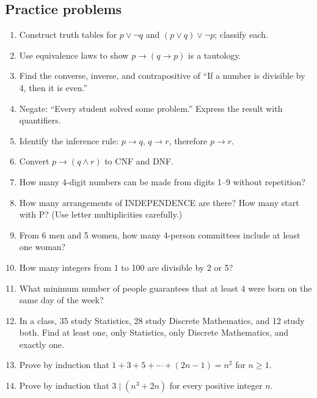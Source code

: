 \documentclass[11pt,a4paper]{article}
\begin{document}
\subsection*{Practice problems}
\begin{enumerate}
\item Construct truth tables for $p\lor\neg q$ and $(p\lor q)\lor\neg p$; classify each.
\item Use equivalence laws to show $p\to(q\to p)$ is a tautology.
\item Find the converse, inverse, and contrapositive of “If a number is divisible by 4, then it is even.”
\item Negate: “Every student solved some problem.” Express the result with quantifiers.
\item Identify the inference rule: $p\to q$, $q\to r$, therefore $p\to r$.
\item Convert $p\to(q\land r)$ to CNF and DNF.
\item How many 4-digit numbers can be made from digits 1--9 without repetition?
\item How many arrangements of INDEPENDENCE are there? How many start with P? (Use letter multiplicities carefully.)
\item From 6 men and 5 women, how many 4-person committees include at least one woman?
\item How many integers from 1 to 100 are divisible by 2 or 5?
\item What minimum number of people guarantees that at least 4 were born on the same day of the week?
\item In a class, 35 study Statistics, 28 study Discrete Mathematics, and 12 study both. Find at least one, only Statistics, only Discrete Mathematics, and exactly one.
\item Prove by induction that $1+3+5+\cdots+(2n-1)=n^2$ for $n\ge1$.
\item Prove by induction that $3\mid(n^3+2n)$ for every positive integer $n$.
\end{enumerate}
\end{document}
